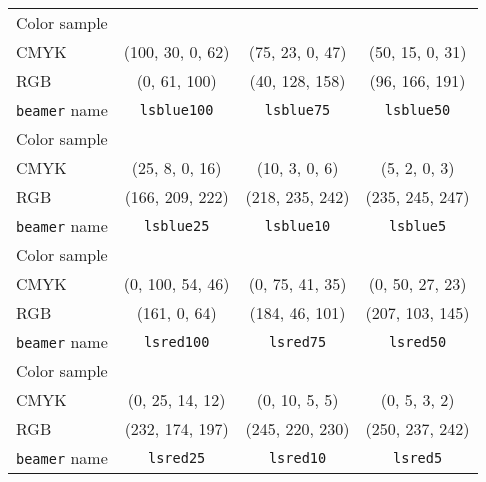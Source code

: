\begin{table}
\setlength{\figurewidth}{12mm}
\centering
\begin{tabulary}{\textwidth}{LCCC}\toprule
Color sample &  &  & \\
CMYK & (100, 30, 0, 62) & (75, 23, 0, 47) & (50, 15, 0, 31)\\
RGB  & (0, 61, 100)     & (40, 128, 158)  & (96, 166, 191)\\
\texttt{beamer} name & \lstinline!lsblue100! & \lstinline!lsblue75! & \lstinline!lsblue50!\\[3mm]
Color sample &  &  & \\
CMYK & (25, 8, 0, 16)  & (10, 3, 0, 6)   & (5, 2, 0, 3)\\
RGB  & (166, 209, 222) & (218, 235, 242) & (235, 245, 247)\\
\texttt{beamer} name & \lstinline!lsblue25! & \lstinline!lsblue10! & \lstinline!lsblue5!\\\midrule

Color sample &  &  & \\
CMYK & (0, 100, 54, 46) & (0, 75, 41, 35) & (0, 50, 27, 23)\\
RGB  & (161, 0, 64)     & (184, 46, 101)  & (207, 103, 145)\\
\texttt{beamer} name & \lstinline!lsred100! & \lstinline!lsred75! & \lstinline!lsred50!\\[3mm]
Color sample &  &  & \\
CMYK & (0, 25, 14, 12)  & (0, 10, 5, 5)   & (0, 5, 3, 2)\\
RGB  & (232, 174, 197) & (245, 220, 230) & (250, 237, 242)\\
\texttt{beamer} name & \lstinline!lsred25! & \lstinline!lsred10! & \lstinline!lsred5!\\\midrule


\end{tabulary}
\end{table}
